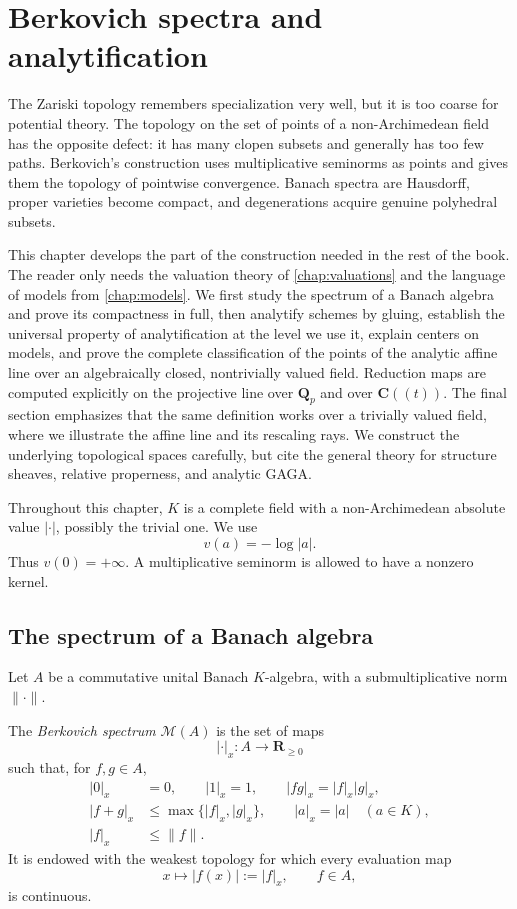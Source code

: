 \chapter{Berkovich spectra and analytification}
\label{chap:berkovich}

The Zariski topology remembers specialization very well, but it is too coarse
for potential theory. The topology on the set of points of a non-Archimedean
field has the opposite defect: it has many clopen subsets and generally has
too few paths. Berkovich's construction uses multiplicative seminorms as
points and gives them the topology of pointwise convergence. Banach spectra
are Hausdorff, proper varieties become compact, and degenerations acquire
genuine polyhedral subsets.

This chapter develops the part of the construction needed in the rest of the
book. The reader only needs the valuation theory of \cref{chap:valuations}
and the language of models from \cref{chap:models}. We first study the
spectrum of a Banach algebra and prove its compactness in full,
then analytify schemes by gluing, establish the universal property of
analytification at the level we use it, explain centers on models, and
prove the complete classification of the points of the analytic affine
line over an algebraically closed, nontrivially valued field. Reduction maps
are computed explicitly on the projective line over $\mathbf Q_p$ and over
$\mathbf C(\!(t)\!)$. The final section emphasizes that the same
definition works over a trivially valued field, where we illustrate the
affine line and its rescaling rays. We construct the underlying
topological spaces carefully, but cite the general theory for structure
sheaves, relative properness, and analytic GAGA.

Throughout this chapter, $K$ is a complete field with a non-Archimedean
absolute value $|\cdot|$, possibly the trivial one. We use
\[
                         v(a)=-\log |a|.
\]
Thus $v(0)=+\infty$. A multiplicative seminorm is allowed to have a
nonzero kernel.

\section{The spectrum of a Banach algebra}
\label{sec:berk-spectrum}

Let $A$ be a commutative unital Banach $K$-algebra, with a
submultiplicative norm $\|\cdot\|$.

\begin{definition}\label{def:berk-spectrum}
The \emph{Berkovich spectrum} $\mathcal M(A)$ is the set of maps
\[
 |\cdot|_x:A\longrightarrow \mathbf R_{\geq 0}
\]
such that, for $f,g\in A$,
\[
\begin{split}
 |0|_x&=0,\qquad |1|_x=1,\qquad |fg|_x=|f|_x|g|_x,\\
 |f+g|_x&\leq\max\{|f|_x,|g|_x\},\qquad
 |a|_x=|a|\quad(a\in K),\\
 |f|_x&\leq\|f\|.
\end{split}
\]
It is endowed with the weakest topology for which every evaluation map
\[
       x\longmapsto |f(x)|:=|f|_x,\qquad f\in A,
\]
is continuous.
\end{definition}

